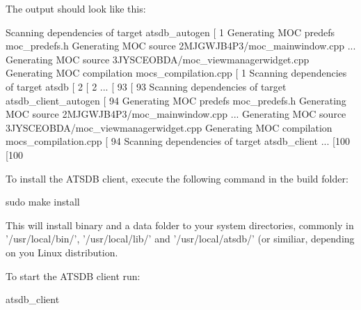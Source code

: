 The output should look like this:

\begin{cverbatim}
Scanning dependencies of target atsdb_autogen
[  1%
Generating MOC predefs moc_predefs.h
Generating MOC source 2MJGWJB4P3/moc_mainwindow.cpp
...
Generating MOC source 3JYSCEOBDA/moc_viewmanagerwidget.cpp
Generating MOC compilation mocs_compilation.cpp
[  1%
Scanning dependencies of target atsdb
[  2%
[  2%
...
[ 93%
[ 93%
Scanning dependencies of target atsdb_client_autogen
[ 94%
Generating MOC predefs moc_predefs.h
Generating MOC source 2MJGWJB4P3/moc_mainwindow.cpp
...
Generating MOC source 3JYSCEOBDA/moc_viewmanagerwidget.cpp
Generating MOC compilation mocs_compilation.cpp
[ 94%
Scanning dependencies of target atsdb_client
...
[100%
[100%
\end{cverbatim}

To install the ATSDB client, execute the following command in the build folder:

\begin{cverbatim}
sudo make install
\end{cverbatim}

This will install binary and a data folder to your system directories, commonly in '/usr/local/bin/', '/usr/local/lib/' and '/usr/local/atsdb/' (or similiar, depending on you Linux distribution.

To start the ATSDB client run:
\begin{cverbatim}
atsdb_client
\end{cverbatim}  
